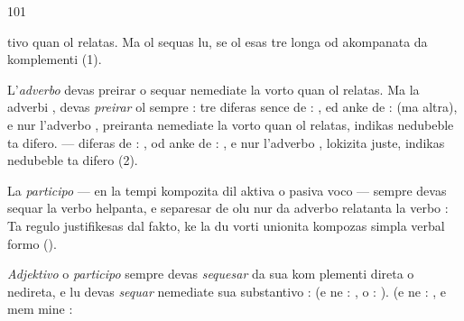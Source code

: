 \begin{VUpage}[105]{101}

\VUcontinue
tivo quan ol relatas. Ma ol sequas lu, se ol esas tre longa\nl
od akompanata da komplementi (1).

L'\textit{adverbo} devas preirar o sequar nemediate la vorto quan\nl
ol relatas. Ma la adverbi ,  devas \textit{preirar} ol sempre :\nl
{} tre diferas sence de : \nl
{}, ed anke de :  (ma altra),\nl
e nur l'adverbo , preiranta nemediate la vorto quan ol\nl
relatas, indikas nedubeble ta difero. --- \cc
{} diferas de : , od\nl
anke de : , e nur l'adverbo\nl
{}, lokizita juste, indikas nedubeble ta difero (2).

La \textit{participo} --- en la tempi kompozita dil aktiva o pasiva\nl
voco --- sempre devas sequar la verbo helpanta, e separesar de\nl
olu nur da adverbo relatanta la verbo : \nl
{} Ta regulo justifikesas dal\nl
fakto, ke la du vorti unionita kompozas simpla verbal formo\nl
().

\textit{Adjektivo} o \textit{participo} sempre devas \textit{sequesar} da sua kom\cc
plementi direta o nedireta, e lu devas \textit{sequar} nemediate sua\nl
substantivo :  (e ne : \nl
{}, o : ). \nl
{} (e ne : \cc
{}, e mem mine : 


\end{VUpage}
